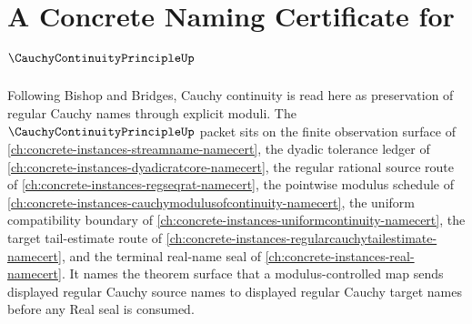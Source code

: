 \chapter{A Concrete Naming Certificate for $\CauchyContinuityPrincipleUp$}
\label{ch:concrete-instances-cauchy-continuity-principle-namecert}

Following Bishop and Bridges, Cauchy continuity is read here as preservation of regular Cauchy names through explicit moduli. The $\CauchyContinuityPrincipleUp$ packet sits on the finite observation surface of \autoref{ch:concrete-instances-streamname-namecert}, the dyadic tolerance ledger of \autoref{ch:concrete-instances-dyadicratcore-namecert}, the regular rational source route of \autoref{ch:concrete-instances-regseqrat-namecert}, the pointwise modulus schedule of \autoref{ch:concrete-instances-cauchymodulusofcontinuity-namecert}, the uniform compatibility boundary of \autoref{ch:concrete-instances-uniformcontinuity-namecert}, the target tail-estimate route of \autoref{ch:concrete-instances-regularcauchytailestimate-namecert}, and the terminal real-name seal of \autoref{ch:concrete-instances-real-namecert}. It names the theorem surface that a modulus-controlled map sends displayed regular Cauchy source names to displayed regular Cauchy target names before any Real seal is consumed.

